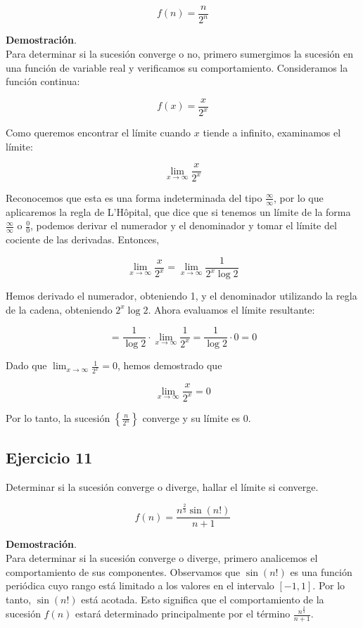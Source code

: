 \documentclass{article}
\begin{document}
    $$
    f(n)=\frac{n}{2^{n}}
    $$

    \textbf{Demostración}.\\

    Para determinar si la sucesión converge o no, primero sumergimos la sucesión en una función de variable real y verificamos su comportamiento. Consideramos la función continua:

    $$
    f(x)=\frac{x}{2^{x}}
    $$

    Como queremos encontrar el límite cuando \( x \) tiende a infinito, examinamos el límite:

    $$
    \lim _{x \rightarrow \infty} \frac{x}{2^{x}}
    $$

    Reconocemos que esta es una forma indeterminada del tipo \(\frac{\infty}{\infty}\), por lo que aplicaremos la regla de L'Hôpital, que dice que si tenemos un límite de la forma \(\frac{\infty}{\infty}\) o \(\frac{0}{0}\), podemos derivar el numerador y el denominador y tomar el límite del cociente de las derivadas. Entonces,

    $$
    \lim _{x \rightarrow \infty} \frac{x}{2^{x}} = \lim _{x \rightarrow \infty} \frac{1}{2^{x} \log 2}
    $$

    Hemos derivado el numerador, obteniendo 1, y el denominador utilizando la regla de la cadena, obteniendo \(2^x \log 2\). Ahora evaluamos el límite resultante:

    $$
    = \frac{1}{\log 2} \cdot \lim _{x \rightarrow \infty} \frac{1}{2^{x}} = \frac{1}{\log 2} \cdot 0 = 0
    $$

    Dado que \( \lim _{x \rightarrow \infty} \frac{1}{2^{x}} = 0 \), hemos demostrado que

    $$
    \lim _{x \rightarrow \infty} \frac{x}{2^{x}} = 0
    $$

    Por lo tanto, la sucesión \( \left\{ \frac{n}{2^n} \right\} \) converge y su límite es 0.

    \subsection*{Ejercicio 11}

    Determinar si la sucesión converge o diverge, hallar el límite si converge.

    $$
    f(n)=\frac{n^{\frac{2}{3}} \sin (n!)}{n+1}
    $$

    \textbf{Demostración}.\\

    Para determinar si la sucesión converge o diverge, primero analicemos el comportamiento de sus componentes. Observamos que $\sin (n!)$ es una función periódica cuyo rango está limitado a los valores en el intervalo $[-1,1]$. Por lo tanto, $\sin(n!)$ está acotada. Esto significa que el comportamiento de la sucesión $f(n)$ estará determinado principalmente por el término $\frac{n^{\frac{2}{3}}}{n+1}$.
\end{document}

